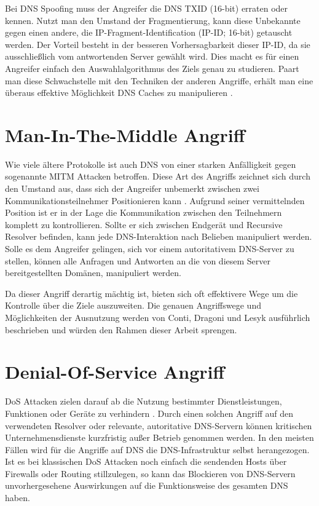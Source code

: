 Bei DNS Spoofing muss der Angreifer die DNS \ac{TXID} (16-bit) erraten oder kennen. Nutzt man den Umstand der Fragmentierung, kann diese Unbekannte gegen einen andere, die IP-Fragment-Identification (IP-ID; 16-bit) getauscht werden. Der Vorteil besteht in der besseren Vorhersagbarkeit dieser IP-ID, da sie ausschließlich vom antwortenden Server gewählt wird. Dies macht es für einen Angreifer einfach den Auswahlalgorithmus des Ziels genau zu studieren. Paart man diese Schwachstelle mit den Techniken der anderen Angriffe, erhält man eine überaus effektive Möglichkeit DNS Caches zu manipulieren \cite{Herzberg2013}.

\section{Man-In-The-Middle Angriff}
\label{sec:attack-mitm}
Wie viele ältere Protokolle ist auch DNS von einer starken Anfälligkeit gegen sogenannte \ac{MITM} Attacken betroffen. Diese Art des Angriffs zeichnet sich durch den Umstand aus, dass sich der Angreifer unbemerkt zwischen zwei Kommunikationsteilnehmer Positionieren kann \cite{CAPEC94}. Aufgrund seiner vermittelnden Position ist er in der Lage die Kommunikation zwischen den Teilnehmern komplett zu kontrollieren. Sollte er sich zwischen Endgerät und Recursive Resolver befinden, kann jede DNS-Interaktion nach Belieben manipuliert werden. Solle es dem Angreifer gelingen, sich vor einem autoritativem DNS-Server zu stellen, können alle Anfragen und Antworten an die von diesem Server bereitgestellten Domänen, manipuliert werden. 

Da dieser Angriff derartig mächtig ist, bieten sich oft effektivere Wege um die Kontrolle über die Ziele auszuweiten. Die genauen Angriffswege und Möglichkeiten der Ausnutzung werden von Conti, Dragoni und Lesyk \cite{Conti2016} ausführlich beschrieben und würden den Rahmen dieser Arbeit sprengen.

\section{Denial-Of-Service Angriff}
\label{sec:attacks-dos}
\ac{DoS} Attacken  zielen darauf ab die Nutzung bestimmter Dienstleistungen, Funktionen oder Geräte zu verhindern \cite{BSIG040}. Durch einen solchen Angriff auf den verwendeten Resolver oder relevante, autoritative DNS-Servern können kritischen Unternehmensdienste kurzfristig außer Betrieb genommen werden. In den meisten Fällen wird für die Angriffe auf DNS die DNS-Infrastruktur selbst herangezogen. Ist es bei klassischen \ac{DoS} Attacken noch einfach die sendenden Hosts über Firewalls oder Routing stillzulegen, so kann das Blockieren von DNS-Servern unvorhergesehene Auswirkungen auf die Funktionsweise des gesamten DNS haben\cite{Kambourakis2008}. 

